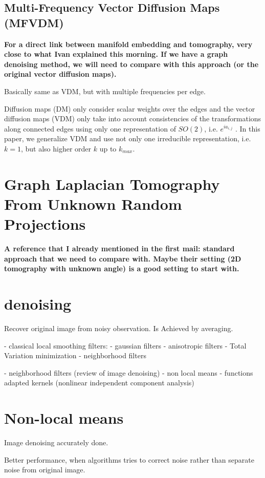 \subsection{Multi-Frequency Vector Diffusion Maps (MFVDM)}
\cite{multiDiffusionMaps}
\textbf{For a direct link between manifold embedding and tomography, very close to what Ivan explained this morning.
If we have a graph denoising method, we will need to compare with this approach 
(or the original vector diffusion maps).}

Basically same as VDM, but with multiple frequencies per edge.

Diffusion maps (DM) only consider scalar weights over the edges and the vector
diffusion maps (VDM) only take into account consistencies
of the transformations along connected edges using only one
representation of $SO(2)$, i.e. $e^{ia_{i,j}}$ . In this paper, we generalize
VDM and use not only one irreducible representation,
i.e. $k = 1$, but also higher order $k$ up to $k_{max}$.


\section{Graph Laplacian Tomography From Unknown Random Projections}
\textbf{A reference that I already mentioned in the first mail:
standard approach that we need to compare with. 
Maybe their setting (2D tomography with unknown angle) is a good setting to start with.
}

\section{denoising}
Recover original image from noisy observation.
Is Achieved by averaging.

- classical local smoothing filters:
    - gaussian filters
    - anisotropic filters
    - Total Variation minimization
    - neighborhood filters

- neighborhood filters (review of image denoising)
- non local means
- functions adapted kernels (nonlinear independent component analysis)


\section{Non-local means}
Image denoising accurately done.

Better performance, when algorithms tries to correct noise rather than separate noise
from original image.

